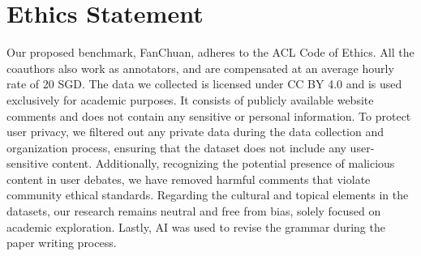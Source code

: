 \section*{Ethics Statement}
Our proposed benchmark, FanChuan, adheres to the ACL Code of Ethics. All the coauthors also work as annotators, and are compensated at an average hourly rate of 20 SGD. The data we collected is licensed under CC BY 4.0 and is used exclusively for academic purposes. It consists of publicly available website comments and does not contain any sensitive or personal information. To protect user privacy, we filtered out any private data during the data collection and organization process, ensuring that the dataset does not include any user-sensitive content. Additionally, recognizing the potential presence of malicious content in user debates, we have removed harmful comments that violate community ethical standards. Regarding the cultural and topical elements in the datasets, our research remains neutral and free from bias, solely focused on academic exploration. Lastly, AI was used to revise the grammar during the paper writing process.